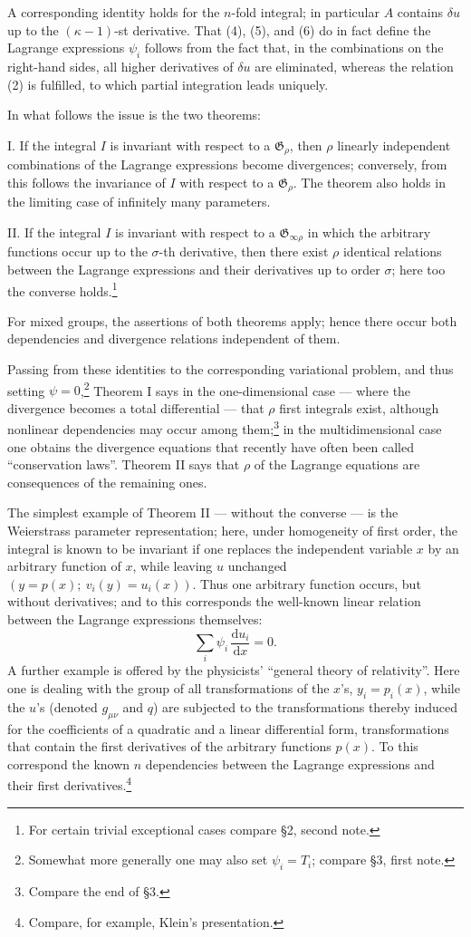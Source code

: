 \documentclass[11pt]{article}
\providecommand{\dd}{\mathrm d}
\providecommand{\G}{\mathfrak G}
\begin{document}
A corresponding identity holds for the \(n\)-fold integral; in particular \(A\) contains \(\delta u\) up to the \((\kappa-1)\)-st derivative. That (4), (5), and (6) do in fact define the Lagrange expressions \(\psi_i\) follows from the fact that, in the combinations on the right-hand sides, all higher derivatives of \(\delta u\) are eliminated, whereas the relation (2) is fulfilled, to which partial integration leads uniquely.

In what follows the issue is the two theorems:

I. If the integral \(I\) is invariant with respect to a \(\G_\rho\), then \(\rho\) linearly independent combinations of the Lagrange expressions become divergences; conversely, from this follows the invariance of \(I\) with respect to a \(\G_\rho\). The theorem also holds in the limiting case of infinitely many parameters.

II. If the integral \(I\) is invariant with respect to a \(\G_{\infty\rho}\) in which the arbitrary functions occur up to the \(\sigma\)-th derivative, then there exist \(\rho\) identical relations between the Lagrange expressions and their derivatives up to order \(\sigma\); here too the converse holds.\footnote{For certain trivial exceptional cases compare \S{}2, second note.}

For mixed groups, the assertions of both theorems apply; hence there occur both dependencies and divergence relations independent of them.

Passing from these identities to the corresponding variational problem, and thus setting \(\psi=0\),\footnote{Somewhat more generally one may also set \(\psi_i=T_i\); compare \S{}3, first note.} Theorem I says in the one-dimensional case --- where the divergence becomes a total differential --- that \(\rho\) first integrals exist, although nonlinear dependencies may occur among them;\footnote{Compare the end of \S{}3.} in the multidimensional case one obtains the divergence equations that recently have often been called ``conservation laws''. Theorem II says that \(\rho\) of the Lagrange equations are consequences of the remaining ones.

The simplest example of Theorem II --- without the converse --- is the Weierstrass parameter representation; here, under homogeneity of first order, the integral is known to be invariant if one replaces the independent variable \(x\) by an arbitrary function of \(x\), while leaving \(u\) unchanged \((y=p(x);\ v_i(y)=u_i(x))\). Thus one arbitrary function occurs, but without derivatives; and to this corresponds the well-known linear relation between the Lagrange expressions themselves:
\[
\sum_i \psi_i\,\frac{\dd u_i}{\dd x}=0.
\]
A further example is offered by the physicists' ``general theory of relativity''. Here one is dealing with the group of all transformations of the \(x\)'s, \(y_i=p_i(x)\), while the \(u\)'s (denoted \(g_{\mu\nu}\) and \(q\)) are subjected to the transformations thereby induced for the coefficients of a quadratic and a linear differential form, transformations that contain the first derivatives of the arbitrary functions \(p(x)\). To this correspond the known \(n\) dependencies between the Lagrange expressions and their first derivatives.\footnote{Compare, for example, Klein's presentation.}
\end{document}
